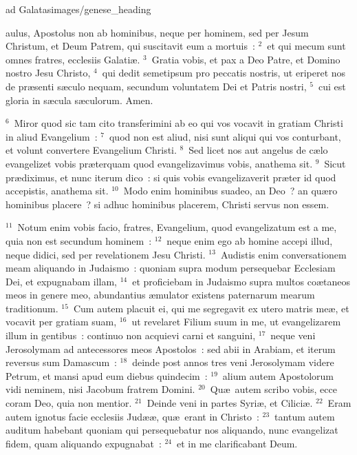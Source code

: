 {ad Galatas}{images/genese_heading}


\bchapter
{}aulus, Apostolus non ab hominibus, neque per hominem, sed per Jesum Christum, et Deum Patrem, qui suscitavit eum a mortuis~:
${}^{2}$~et qui mecum sunt omnes fratres, ecclesiis Galati\ae .
${}^{3}$~Gratia vobis, et pax a Deo Patre, et Domino nostro Jesu Christo,
${}^{4}$~qui dedit semetipsum pro peccatis nostris, ut eriperet nos de pr\ae senti s\ae culo nequam, secundum voluntatem Dei et Patris nostri,
${}^{5}$~cui est gloria in s\ae cula s\ae culorum. Amen.


${}^{6}$~Miror quod sic tam cito transferimini ab eo qui vos vocavit in gratiam Christi in aliud Evangelium~:
${}^{7}$~quod non est aliud, nisi sunt aliqui qui vos conturbant, et volunt convertere Evangelium Christi.
${}^{8}$~Sed licet nos aut angelus de c\ae lo evangelizet vobis pr\ae terquam quod evangelizavimus vobis, anathema sit.
${}^{9}$~Sicut pr\ae diximus, et nunc iterum dico~: si quis vobis evangelizaverit pr\ae ter id quod accepistis, anathema sit.
${}^{10}$~Modo enim hominibus suadeo, an Deo~? an qu\ae ro hominibus placere~? si adhuc hominibus placerem, Christi servus non essem.


${}^{11}$~Notum enim vobis facio, fratres, Evangelium, quod evangelizatum est a me, quia non est secundum hominem~:
${}^{12}$~neque enim ego ab homine accepi illud, neque didici, sed per revelationem Jesu Christi.
${}^{13}$~Audistis enim conversationem meam aliquando in Judaismo~: quoniam supra modum persequebar Ecclesiam Dei, et expugnabam illam,
${}^{14}$~et proficiebam in Judaismo supra multos co\ae taneos meos in genere meo, abundantius \ae mulator existens paternarum mearum traditionum.
${}^{15}$~Cum autem placuit ei, qui me segregavit ex utero matris me\ae , et vocavit per gratiam suam,
${}^{16}$~ut revelaret Filium suum in me, ut evangelizarem illum in gentibus~: continuo non acquievi carni et sanguini,
${}^{17}$~neque veni Jerosolymam ad antecessores meos Apostolos~: sed abii in Arabiam, et iterum reversus sum Damascum~:
${}^{18}$~deinde post annos tres veni Jerosolymam videre Petrum, et mansi apud eum diebus quindecim~:
${}^{19}$~alium autem Apostolorum vidi neminem, nisi Jacobum fratrem Domini.
${}^{20}$~Qu\ae\ autem scribo vobis, ecce coram Deo, quia non mentior.
${}^{21}$~Deinde veni in partes Syri\ae , et Cilici\ae .
${}^{22}$~Eram autem ignotus facie ecclesiis Jud\ae \ae , qu\ae\ erant in Christo~:
${}^{23}$~tantum autem auditum habebant quoniam qui persequebatur nos aliquando, nunc evangelizat fidem, quam aliquando expugnabat~:
${}^{24}$~et in me clarificabant Deum.


